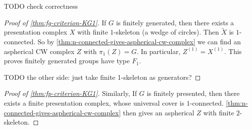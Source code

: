 TODO check correctness

\begin{proof}[Proof of \cref{thm:fg-criterion-KG1}]
    If \(G\) is finitely generated, then there exists a presentation complex \(X\) with finite \(1\)-skeleton (a wedge of circles). Then \(\tilde X\) is \(1\)-connected. So by \cref{thm:n-connected-gives-aspherical-cw-complex} we can find an aspherical CW complex \(Z\) with \(\pi_1(Z)=G\). In particular, \(Z^{(1)}=X^{(1)}\). This proves finitely generated groups have type \(F_1\). 
    
    TODO the other side: just take finite 1-skeleton as generators?
\end{proof}

\begin{proof}[Proof of \cref{thm:fp-criterion-KG1}]
    Similarly, If \(G\) is finitely presented, then there exists a finite presentation complex, whose universal cover is \(1\)-connected. \cref{thm:n-connected-gives-aspherical-cw-complex} then gives an aspherical \(Z\) with finite \(2\)-skeleton.
\end{proof}

 

